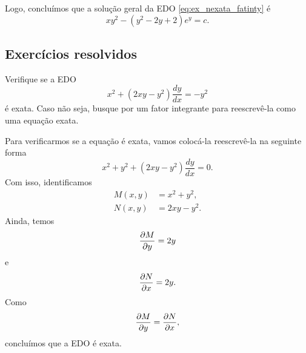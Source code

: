 \begin{ex}
  Logo, concluímos que a solução geral da EDO \eqref{eq:ex_nexata_fatinty} é
  \begin{equation}
    xy^2 - (y^2-2y+2)e^y = c.
  \end{equation}
\end{ex}

\subsection*{Exercícios resolvidos}

\begin{exeresol}
  Verifique se a EDO
  \begin{equation}
    x^2 + (2xy-y^2)\frac{dy}{dx} = -y^2
  \end{equation}
  é exata. Caso não seja, busque por um fator integrante para reescrevê-la como uma equação exata.
\end{exeresol}
\begin{resol}
  Para verificarmos se a equação é exata, vamos colocá-la reescrevê-la na seguinte forma
  \begin{equation}
    x^2 + y^2 + (2xy-y^2)\frac{dy}{dx} = 0.
  \end{equation}
  Com isso, identificamos
  \begin{align}
    M(x,y) &= x^2 + y^2,\\
    N(x,y) &= 2xy-y^2.
  \end{align}
  Ainda, temos
  \begin{equation}
    \frac{\partial M}{\partial y} = 2y
  \end{equation}
  e
  \begin{equation}
    \frac{\partial N}{\partial x} = 2y.
  \end{equation}
  Como
  \begin{equation}
    \frac{\partial M}{\partial y} = \frac{\partial N}{\partial x},
  \end{equation}
  concluímos que a EDO é exata.
\end{resol}

